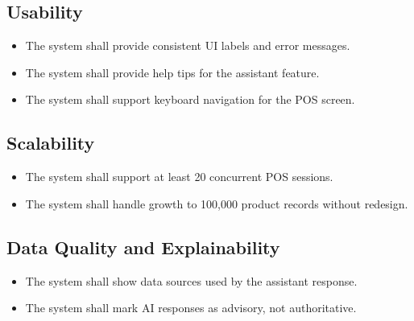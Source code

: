 \subsection{Usability}
\begin{itemize}
    \item The system shall provide consistent UI labels and error messages.
    \item The system shall provide help tips for the assistant feature.
    \item The system shall support keyboard navigation for the POS screen.
\end{itemize}

\subsection{Scalability}
\begin{itemize}
    \item The system shall support at least 20 concurrent POS sessions.
    \item The system shall handle growth to 100,000 product records without redesign.
\end{itemize}

\subsection{Data Quality and Explainability}
\begin{itemize}
    \item The system shall show data sources used by the assistant response.
    \item The system shall mark AI responses as advisory, not authoritative.
\end{itemize}
